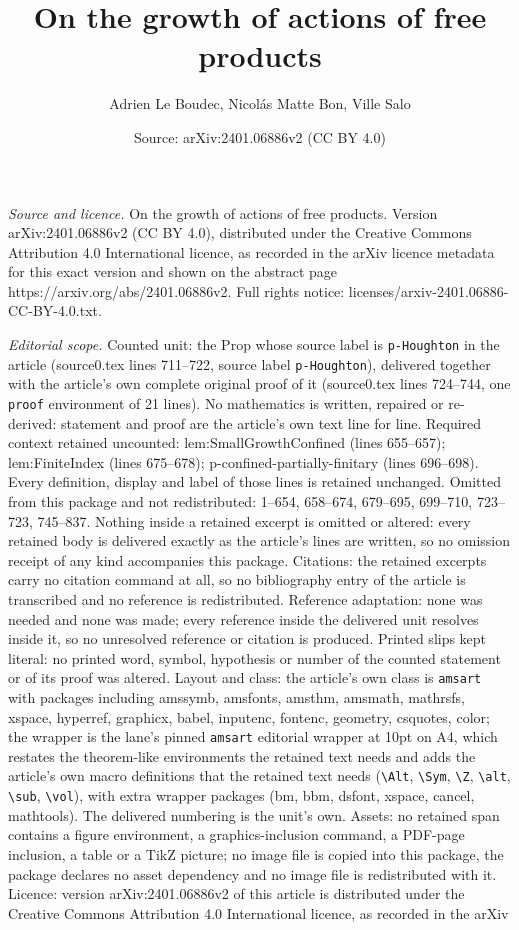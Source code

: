 \documentclass[10pt,a4paper]{amsart}
\title[On the growth of actions of free products]{On the growth of actions of free products}
\author{Adrien Le Boudec, Nicol\'as Matte Bon, Ville Salo}
\date{Source: arXiv:2401.06886v2 (CC BY 4.0)}
\begin{document}
\maketitle

\noindent\emph{Source and licence.} On the growth of actions of free products. Version arXiv:2401.06886v2 (CC BY 4.0), distributed under the Creative Commons Attribution 4.0 International licence, as recorded in the arXiv licence metadata for this exact version and shown on the abstract page https://arxiv.org/abs/2401.06886v2. Full rights notice: licenses/arxiv-2401.06886-CC-BY-4.0.txt.\par\smallskip

\noindent\textit{Editorial scope.} Counted unit: the Prop whose source label is \texttt{p-Houghton} in the article (source0.tex lines 711--722, source label \texttt{p-Houghton}), delivered together with the article's own complete original proof of it (source0.tex lines 724--744, one \texttt{proof} environment of 21 lines). No mathematics is written, repaired or re-derived: statement and proof are the article's own text line for line. Required context retained uncounted: lem:SmallGrowthConfined (lines 655--657); lem:FiniteIndex (lines 675--678); p-confined-partially-finitary (lines 696--698). Every definition, display and label of those lines is retained unchanged. Omitted from this package and not redistributed: 1--654, 658--674, 679--695, 699--710, 723--723, 745--837. Nothing inside a retained excerpt is omitted or altered: every retained body is delivered exactly as the article's lines are written, so no omission receipt of any kind accompanies this package. Citations: the retained excerpts carry no citation command at all, so no bibliography entry of the article is transcribed and no reference is redistributed. Reference adaptation: none was needed and none was made; every reference inside the delivered unit resolves inside it, so no unresolved reference or citation is produced. Printed slips kept literal: no printed word, symbol, hypothesis or number of the counted statement or of its proof was altered. Layout and class: the article's own class is \texttt{amsart} with packages including amssymb, amsfonts, amsthm, amsmath, mathrsfs, xspace, hyperref, graphicx, babel, inputenc, fontenc, geometry, csquotes, color; the wrapper is the lane's pinned \texttt{amsart} editorial wrapper at 10pt on A4, which restates the theorem-like environments the retained text needs and adds the article's own macro definitions that the retained text needs (\texttt{\textbackslash Alt}, \texttt{\textbackslash Sym}, \texttt{\textbackslash Z}, \texttt{\textbackslash alt}, \texttt{\textbackslash sub}, \texttt{\textbackslash vol}), with extra wrapper packages (bm, bbm, dsfont, xspace, cancel, mathtools). The delivered numbering is the unit's own. Assets: no retained span contains a figure environment, a graphics-inclusion command, a PDF-page inclusion, a table or a TikZ picture; no image file is copied into this package, the package declares no asset dependency and no image file is redistributed with it. Licence: version arXiv:2401.06886v2 of this article is distributed under the Creative Commons Attribution 4.0 International licence, as recorded in the arXiv 
\end{document}
